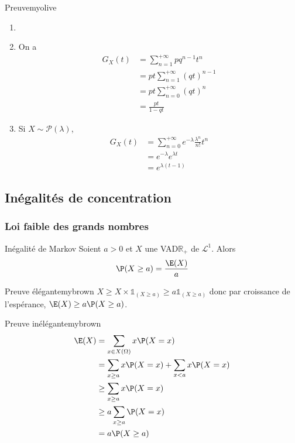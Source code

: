     \begin{demo}{Preuve}{myolive}
        \begin{enumerate}
            \item 
            \item On a 
            \begin{align*}
                G_X(t) 
                &= \sum_{n=1}^{+\infty} pq^{n-1} t^n \\
                &= pt \sum_{n=1}^{+\infty} (qt)^{n-1} \\
                &= pt \sum_{n=0}^{+\infty} (qt)^n \\
                &= \frac{pt}{1 - qt} 
            \end{align*}
            \item Si $X \sim \mathcal{P}(\lambda)$, 
            \begin{align*}
                G_X(t) 
                &= \sum_{n=0}^{+\infty} e^{-\lambda} \frac{\lambda^n}{n!} t^n \\
                &= e^{-\lambda} e^{\lambda t} \\
                &= e^{\lambda(t - 1)}
            \end{align*}
        \end{enumerate}
    \end{demo}

\subsection{Inégalités de concentration}

    \subsubsection{Loi faible des grands nombres}

    \begin{lem}{Inégalité de Markov}{}
        Soient $a > 0$ et $X$ une VAD$\mathbb{R}_+$ de $\mathcal{L}^1$. Alors 
        \[ \P(X \geq a) = \frac{\E(X)}{a} \]    
    \end{lem}

    \begin{demo}{Preuve élégante}{mybrown}
        $X \geq X \times \mathbb{1}_{(X \geq a)} \geq a \mathbb{1}_{(X \geq a)}$ donc par croissance de l’espérance, $\E(X) \geq a \P(X \geq a)$.
    \end{demo}

    \begin{demo}{Preuve inélégante}{mybrown}
        \begin{align*}
            \E(X) &= \sum_{x \in X(\Omega)} x \P(X = x) \\
            &= \sum_{x \geq a} x \P(X = x) + \sum_{x < a} x \P(X = x) \\
            &\geq \sum_{x \geq a} x \P(X = x) \\
            &\geq a \sum_{x \geq a} \P(X = x) \\
            &= a \P(X \geq a)
        \end{align*}
    \end{demo}

